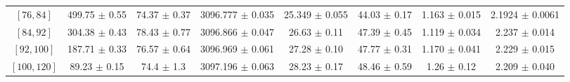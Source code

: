 \begin{tabular}{c||c|c|c|c|c|c|c}
$[76, 84]$ & 499.75 $\pm$ 0.55 & 74.37 $\pm$ 0.37 & 3096.777 $\pm$ 0.035 & 25.349 $\pm$ 0.055 & 44.03 $\pm$ 0.17 & 1.163 $\pm$ 0.015 & 2.1924 $\pm$ 0.0061\\
$[84, 92]$ & 304.38 $\pm$ 0.43 & 78.43 $\pm$ 0.77 & 3096.866 $\pm$ 0.047 & 26.63 $\pm$ 0.11 & 47.39 $\pm$ 0.45 & 1.119 $\pm$ 0.034 & 2.237 $\pm$ 0.014\\
$[92, 100]$ & 187.71 $\pm$ 0.33 & 76.57 $\pm$ 0.64 & 3096.969 $\pm$ 0.061 & 27.28 $\pm$ 0.10 & 47.77 $\pm$ 0.31 & 1.170 $\pm$ 0.041 & 2.229 $\pm$ 0.015\\
$[100, 120]$ & 89.23 $\pm$ 0.15 & 74.4 $\pm$ 1.3 & 3097.196 $\pm$ 0.063 & 28.23 $\pm$ 0.17 & 48.46 $\pm$ 0.59 & 1.26 $\pm$ 0.12 & 2.209 $\pm$ 0.040\\
\end{tabular}
